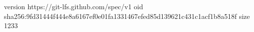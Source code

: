 version https://git-lfs.github.com/spec/v1
oid sha256:9fd31444f444e8a6167ef0e01fa1331467efed85d139621c431c1acf1b8a518f
size 1233
